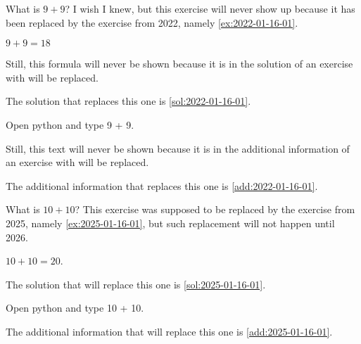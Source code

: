 \documentclass{book}
\begin{document}
\begin{exercise}[examdate={January 16, 2023}, examproblemnumber={1}, examproblemid={2023-01-16-01}, replacedbyexamproblemid={2022-01-16-01}, replacementsinceacademicyear={2025/2026}]
  What is \(9 + 9\)? I wish I knew, but this exercise will never show up because it has been replaced by the exercise from 2022, namely \cref{ex:2022-01-16-01}.
\end{exercise}

\begin{solution}
  \(9 + 9 = 18\)

Still, this formula will never be shown because it is in the solution of an exercise with will be replaced.

The solution that replaces this one is \cref{sol:2022-01-16-01}.
\end{solution}

\begin{additionalinformation}
Open python and type 9 + 9.

Still, this text will never be shown because it is in the additional information of an exercise with will be replaced.

The additional information that replaces this one is \cref{add:2022-01-16-01}.
\end{additionalinformation}

\begin{exercise}[examdate={January 16, 2024}, examproblemnumber={1}, examproblemid={2024-01-16-01}, replacedbyexamproblemid={2023-01-16-01}, replacementsinceacademicyear={2026/2027}]
  What is \(10 + 10\)? This exercise was supposed to be replaced by the exercise from 2025, namely \cref{ex:2025-01-16-01}, but such replacement will not happen until 2026.
\end{exercise}

\begin{solution}
  \(10 + 10 = 20\).

  The solution that will replace this one is \cref{sol:2025-01-16-01}.
\end{solution}

\begin{additionalinformation}
Open python and type 10 + 10.

The additional information that will replace this one is \cref{add:2025-01-16-01}.
\end{additionalinformation}

\end{document}
